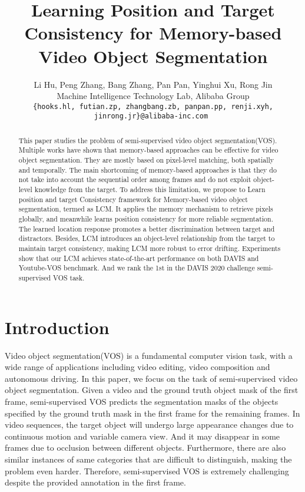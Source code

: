 \documentclass[final]{cvpr}
\begin{document}
\title{Learning Position and Target Consistency for Memory-based Video Object Segmentation}




\author{Li Hu,  Peng Zhang,  Bang Zhang,  Pan Pan,  Yinghui Xu,  Rong Jin\\
Machine Intelligence Technology Lab, Alibaba Group\\
\tt\small \{hooks.hl, futian.zp, zhangbang.zb, panpan.pp, renji.xyh, jinrong.jr\}@alibaba-inc.com
}




\maketitle
\pagestyle{empty}
\thispagestyle{empty}



\begin{abstract}
This paper studies the problem of semi-supervised video object segmentation(VOS). Multiple works have shown that memory-based approaches can be effective for video object segmentation. They are mostly based on pixel-level matching, both spatially and temporally. The main shortcoming of memory-based approaches is that they do not take into account the sequential order among frames and do not exploit object-level knowledge from the target. To address this limitation, we propose to Learn position and target Consistency framework for Memory-based video object segmentation, termed as LCM. It applies the memory mechanism to retrieve pixels globally, and meanwhile learns position consistency for more reliable segmentation. The learned location response promotes a better discrimination between target and distractors. Besides, LCM introduces an object-level relationship from the target to maintain target consistency, making LCM more robust to error drifting. Experiments show that our LCM achieves state-of-the-art performance on both DAVIS and Youtube-VOS benchmark. And we rank the 1st in the DAVIS 2020 challenge semi-supervised VOS task.
\end{abstract}

\section{Introduction}

Video object segmentation(VOS) is a fundamental computer vision task, with a wide range of applications including video editing, video composition and autonomous driving. In this paper, we focus on the task of semi-supervised video object segmentation. Given a video and the ground truth object mask of the first frame, semi-supervised VOS predicts the segmentation masks of the objects specified by the ground truth mask in the first frame for the remaining frames. In video sequences, the target object will undergo large appearance changes due to continuous motion and variable camera view. And it may disappear in some frames due to occlusion between different objects. Furthermore, there are also similar instances of same categories that are difficult to distinguish, making the problem even harder. Therefore, semi-supervised VOS is extremely challenging despite the provided annotation in the first frame. 
\end{document}
